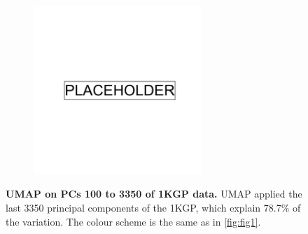 \begin{figure}[ht]
    \centering
    \begin{subfigure}{0.95\textwidth}
    \includegraphics[width=0.7\textwidth]{placeholder.png}
    \end{subfigure}
    \caption[UMAP on PCs 100 to 3350 of 1KGP data]{\textbf{UMAP on PCs 100 to 3350 of 1KGP data.} UMAP applied the last 3350 principal components of the 1KGP, which explain 78.7\% of the variation. The colour scheme is the same as in \ref{fig:fig1}.}
    \label{fig:supp_1kgp_3350}
\end{figure}

\newpage

